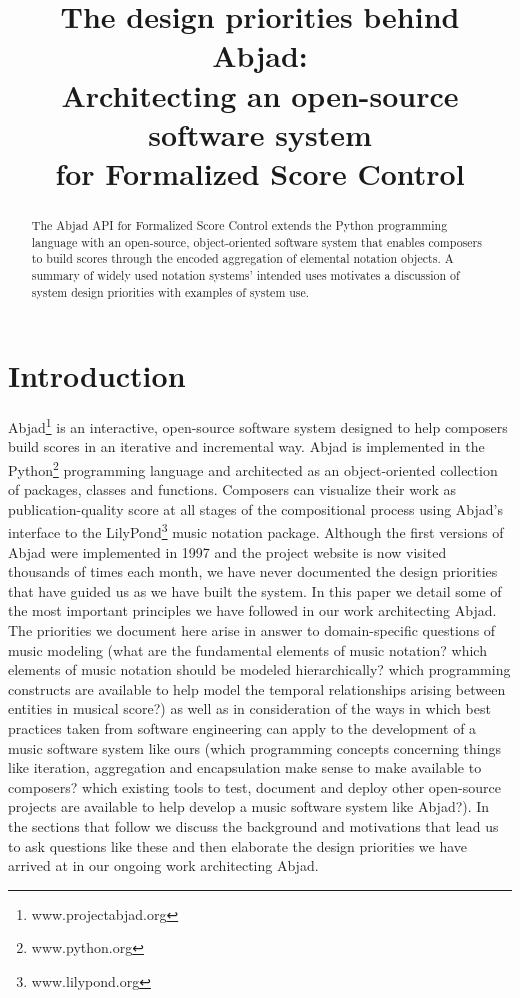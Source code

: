 \documentclass{article}
\title{The design priorities behind Abjad: \\
Architecting an open-source software system \\
for Formalized Score Control}
\begin{document}
\capstartfalse
\maketitle
\capstarttrue

\begin{abstract}
The Abjad API for Formalized Score Control extends the Python programming language with an open-source, object-oriented software system that enables composers to build scores through the encoded aggregation of elemental notation objects. A summary of widely used notation systems' intended uses motivates a discussion of system design priorities with examples of system use.
\end{abstract}

\section{Introduction} \label{sec:background}
Abjad\footnote{www.projectabjad.org} is an interactive, open-source software
system designed to help composers build scores in
an iterative and incremental way.  Abjad is implemented in the
Python\footnote{www.python.org} programming language and architected as an
object-oriented collection of packages, classes and functions. Composers can
visualize their work as publication-quality score at all stages of the
compositional process using Abjad's interface to the
LilyPond\footnote{www.lilypond.org} music notation package. Although the first
versions of Abjad were implemented in 1997 and the project website is now
visited thousands of times each month, we have never documented the design
priorities that have guided us as we have built the system. In this paper we
detail some of the most important principles we have followed in our work
architecting Abjad. The priorities we document here arise in answer to
domain-specific questions of music modeling (what are the fundamental elements
of music notation? which elements of music notation should be modeled
hierarchically? which programming constructs are available to help model the
temporal relationships arising between entities in musical score?) as well as
in consideration of the ways in which best practices taken from software
engineering can apply to the development of a music software system like ours
(which programming concepts concerning things like iteration, aggregation and
encapsulation make sense to make available to composers? which existing tools
to test, document and deploy other open-source projects are available to help
develop a music software system like Abjad?). In the sections that follow we
discuss the background and motivations that lead us to ask questions like these
and then elaborate the design priorities we have arrived at in our ongoing work
architecting Abjad.
\end{document}

